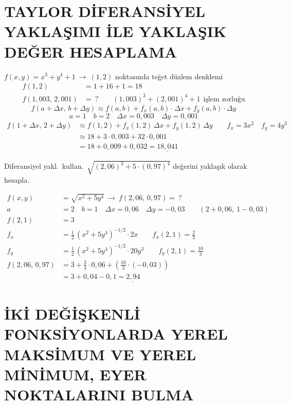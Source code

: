 \documentclass[11pt,a4paper]{article}
\begin{document}

\section{TAYLOR DİFERANSİYEL YAKLAŞIMI İLE YAKLAŞIK DEĞER HESAPLAMA}

$f(x,y)=x^3+y^4+1\ \longrightarrow\ (1,2)$ noktasında teğet düzlem denklemi
\begin{align*}
f(1,2)&=1+16+1=18\\
f(1{,}003,\,2{,}001)&=\ ?\qquad (1{,}003)^3+(2{,}001)^4+1\ \ \text{işlem zorluğu}
\end{align*}
\[ f(a+\Delta x,\,b+\Delta y)\approx f(a,b)+f_x(a,b)\cdot\Delta x+f_y(a,b)\cdot\Delta y \]
\[ a=1\quad b=2\quad \Delta x=0{,}003\quad \Delta y=0{,}001 \]
\begin{align*}
f(1+\Delta x,\,2+\Delta y)&\approx f(1,2)+f_x(1,2)\,\Delta x+f_y(1,2)\,\Delta y\qquad f_x=3x^2\quad f_y=4y^3\\
&\approx 18+3\cdot 0{,}003+32\cdot 0{,}001\\
&=18+0{,}009+0{,}032=\underline{18{,}041}
\end{align*}

\begin{ornek}
Diferansiyel yakl.\ kullan.\ $\sqrt{(2{,}06)^2+5\cdot(0{,}97)^4}$ değerini yaklaşık olarak hesapla.
\end{ornek}
\begin{align*}
f(x,y)&=\sqrt{x^2+5y^4}\ \longrightarrow\ f(2{,}06,\,0{,}97)=\ ?\\
a&=2\quad b=1\quad \Delta x=0{,}06\quad \Delta y=-0{,}03\qquad (2+0{,}06,\ 1-0{,}03)\\
f(2,1)&=3\\
f_x&=\tfrac12\,(x^2+5y^4)^{-1/2}\cdot 2x\qquad f_x(2,1)=\tfrac23\\
f_y&=\tfrac12\,(x^2+5y^4)^{-1/2}\cdot 20y^3\qquad f_y(2,1)=\tfrac{10}{3}\\
f(2{,}06,\,0{,}97)&=3+\tfrac23\cdot 0{,}06+\left(\tfrac{10}{3}\cdot(-0{,}03)\right)\\
&=3+0{,}04-0{,}1=\underline{2{,}94}
\end{align*}

\section{İKİ DEĞİŞKENLİ FONKSİYONLARDA YEREL MAKSİMUM VE YEREL MİNİMUM, EYER NOKTALARINI BULMA}
\end{document}
